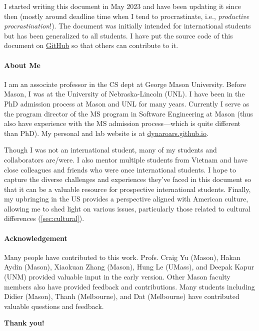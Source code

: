 \documentclass[oneside,11pt,dvipsnames]{book}
\begin{document}
I started writing this document in May 2023 and have been updating it since then (mostly around deadline time when I tend to procrastinate, i.e., \emph{productive procrastination}!). The document was initially intended for international students but has been generalized to all students.
I have put the source code of this document on \href{https://github.com/nguyenthanhvuh/phd-cs-us}{GitHub} so that others can contribute to it.

\paragraph{About Me} I am an associate professor in the CS dept at George Mason University. Before Mason, I was at the University of Nebraska-Lincoln (UNL). I have been in the PhD admission process at Mason and UNL for many years.  Currently I serve as the program director of the MS program in Software Engineering at Mason (thus also have experience with the MS admission process---which is quite different than PhD). My personal and lab website is at \href{https://dynaroars.github.io}{dynaroars.github.io}.

Though I was not an international student, many of my students and collaborators are/were. I also mentor multiple students from Vietnam and have close colleagues and friends who were once international students. I hope to capture the diverse challenges and experiences they've faced in this document so that it can be a valuable resource for prospective international students.
Finally, my upbringing in the US provides a perspective aligned with American culture, allowing me to shed light on various issues, particularly those related to cultural differences (\autoref{sec:cultural}).




\paragraph{Acknowledgement} Many people have contributed to this work.
Profs. Craig Yu (Mason), Hakan Aydin (Mason), 
Xiaokuan Zhang (Mason), Hung Le (UMass), and Deepak Kapur (UNM) provided valuable input in the early version. Other Mason faculty members also have provided feedback and contributions.  Many students including Didier (Mason), Thanh (Melbourne), and Dat (Melbourne) have contributed valuable questions and feedback. 

\textbf{Thank you!}

%
%
\end{document}
